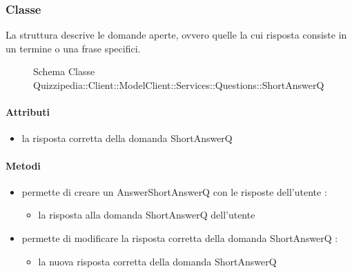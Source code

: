 \subsubsection{Classe }
La struttura descrive le domande aperte, ovvero quelle la cui risposta consiste in un termine o una frase specifici.
\begin{figure}[H]
\centering
\noindent{}
\caption[Schema Classe ShortAnswerQ]{Schema Classe Quizzipedia::Client::ModelClient::Services::Questions::ShortAnswerQ}
\end{figure}
\paragraph{Attributi}
\begin{itemize}
\item {}
\newline
la risposta corretta della domanda ShortAnswerQ
\end{itemize}
\paragraph{Metodi}
\begin{itemize}
\item {}
\newline
permette di creare un AnswerShortAnswerQ con le risposte dell'utente
\newline
{} :
\begin{itemize}
\item {}
\newline
la risposta alla domanda ShortAnswerQ dell'utente
\end{itemize}
\item {}
\newline
permette di modificare la risposta corretta della domanda ShortAnswerQ
\newline
{} :
\begin{itemize}
\item {}
\newline
la nuova risposta corretta della domanda ShortAnswerQ
\end{itemize}
\end{itemize}
